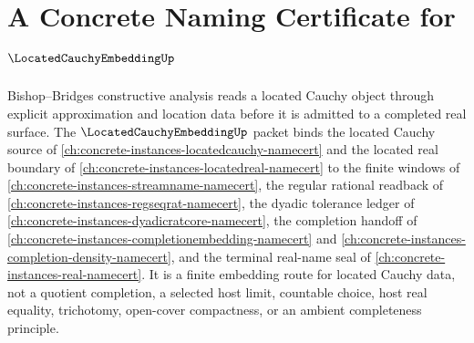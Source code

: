 \chapter{A Concrete Naming Certificate for $\LocatedCauchyEmbeddingUp$}
\label{ch:concrete-instances-located-cauchy-embedding-namecert}

Bishop--Bridges constructive analysis reads a located Cauchy object through explicit approximation and location data before it is admitted to a completed real surface. The $\LocatedCauchyEmbeddingUp$ packet binds the located Cauchy source of \autoref{ch:concrete-instances-locatedcauchy-namecert} and the located real boundary of \autoref{ch:concrete-instances-locatedreal-namecert} to the finite windows of \autoref{ch:concrete-instances-streamname-namecert}, the regular rational readback of \autoref{ch:concrete-instances-regseqrat-namecert}, the dyadic tolerance ledger of \autoref{ch:concrete-instances-dyadicratcore-namecert}, the completion handoff of \autoref{ch:concrete-instances-completionembedding-namecert} and \autoref{ch:concrete-instances-completion-density-namecert}, and the terminal real-name seal of \autoref{ch:concrete-instances-real-namecert}. It is a finite embedding route for located Cauchy data, not a quotient completion, a selected host limit, countable choice, host real equality, trichotomy, open-cover compactness, or an ambient completeness principle.

